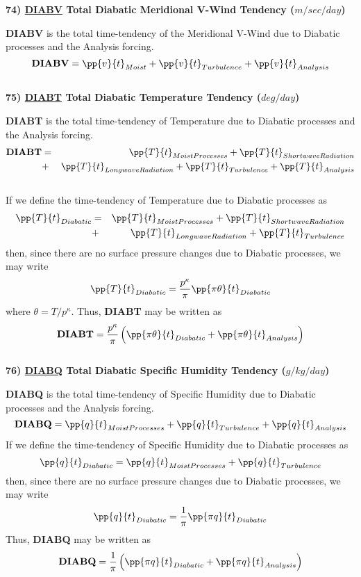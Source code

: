 \noindent
{\bf 74)  \underline {DIABV} Total Diabatic Meridional V-Wind Tendency  ($m/sec/day$) }

\noindent
{\bf DIABV} is the total time-tendency of the Meridional V-Wind due to Diabatic processes
and the Analysis forcing.
\[
{\bf DIABV} = \pp{v}{t}_{Moist} + \pp{v}{t}_{Turbulence} + \pp{v}{t}_{Analysis} 
\]
\\

\noindent
{\bf 75)  \underline {DIABT} Total Diabatic Temperature Tendency  ($deg/day$) }

\noindent
{\bf DIABT} is the total time-tendency of Temperature due to Diabatic processes
and the Analysis forcing.
\begin{eqnarray*}
{\bf DIABT} & = & \pp{T}{t}_{Moist Processes} + \pp{T}{t}_{Shortwave Radiation} \\
           & + & \pp{T}{t}_{Longwave Radiation} + \pp{T}{t}_{Turbulence} + \pp{T}{t}_{Analysis} 
\end{eqnarray*}
\\
If we define the time-tendency of Temperature due to Diabatic processes as
\begin{eqnarray*}
\pp{T}{t}_{Diabatic} & = & \pp{T}{t}_{Moist Processes} + \pp{T}{t}_{Shortwave Radiation} \\
                     & + & \pp{T}{t}_{Longwave Radiation} + \pp{T}{t}_{Turbulence}
\end{eqnarray*}
then, since there are no surface pressure changes due to Diabatic processes, we may write
\[
\pp{T}{t}_{Diabatic} = {p^\kappa \over \pi }\pp{\pi \theta}{t}_{Diabatic}
\]
where $\theta = T/p^\kappa$.  Thus, {\bf DIABT} may be written as
\[
{\bf DIABT} = {p^\kappa \over \pi } \left( \pp{\pi \theta}{t}_{Diabatic} + \pp{\pi \theta}{t}_{Analysis} \right)
\]
\\

\noindent
{\bf 76)  \underline {DIABQ} Total Diabatic Specific Humidity Tendency  ($g/kg/day$) }

\noindent
{\bf DIABQ} is the total time-tendency of Specific Humidity due to Diabatic processes
and the Analysis forcing.
\[
{\bf DIABQ} = \pp{q}{t}_{Moist Processes} + \pp{q}{t}_{Turbulence} + \pp{q}{t}_{Analysis} 
\]
If we define the time-tendency of Specific Humidity due to Diabatic processes as
\[
\pp{q}{t}_{Diabatic} = \pp{q}{t}_{Moist Processes} + \pp{q}{t}_{Turbulence}
\]
then, since there are no surface pressure changes due to Diabatic processes, we may write
\[
\pp{q}{t}_{Diabatic} = {1 \over \pi }\pp{\pi q}{t}_{Diabatic}
\]
Thus, {\bf DIABQ} may be written as
\[
{\bf DIABQ} = {1 \over \pi } \left( \pp{\pi q}{t}_{Diabatic} + \pp{\pi q}{t}_{Analysis} \right)
\]
\\

